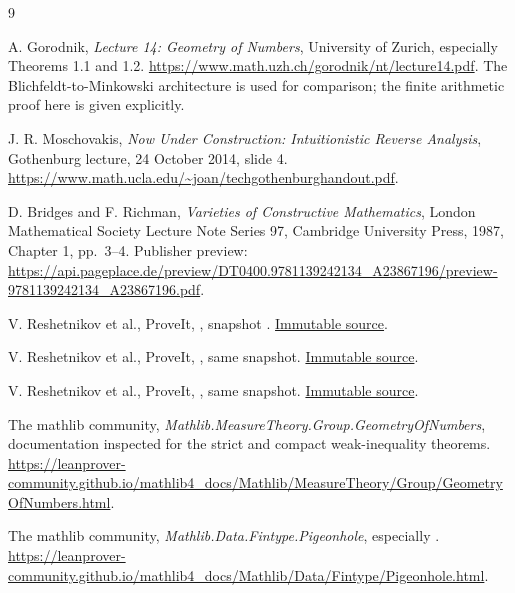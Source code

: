 \begin{thebibliography}{9}
\raggedright
{}
A. Gorodnik, \emph{Lecture 14: Geometry of Numbers},
University of Zurich, especially Theorems 1.1 and 1.2.
\url{https://www.math.uzh.ch/gorodnik/nt/lecture14.pdf}.
The Blichfeldt-to-Minkowski architecture is used
for comparison; the finite arithmetic proof
here is given explicitly.

J. R. Moschovakis, \emph{Now Under Construction:
Intuitionistic Reverse Analysis}, Gothenburg lecture,
24 October 2014, slide 4.
\url{https://www.math.ucla.edu/~joan/techgothenburghandout.pdf}.

D. Bridges and F. Richman, \emph{Varieties of
Constructive Mathematics}, London Mathematical
Society Lecture Note Series 97, Cambridge
University Press, 1987, Chapter 1, pp.\ 3--4.
Publisher preview:
\url{https://api.pageplace.de/preview/DT0400.9781139242134_A23867196/preview-9781139242134_A23867196.pdf}.

V. Reshetnikov et al., ProveIt,
,
snapshot .
\href{https://github.com/VladimirReshetnikov/ProveIt/blob/329161f8da0b319d51ba9f6246c4b19d243f7193/Logic/PrimitiveRecursiveArithmetic/ConciseIPRA/Lean/ConciseIPRA/PR.lean}{Immutable source}.

V. Reshetnikov et al., ProveIt,
,
same snapshot.
\href{https://github.com/VladimirReshetnikov/ProveIt/blob/329161f8da0b319d51ba9f6246c4b19d243f7193/Logic/PrimitiveRecursiveArithmetic/ConciseIPRA/Lean/ConciseIPRA/BiInterpretation.lean}{Immutable source}.

V. Reshetnikov et al., ProveIt,
\allowbreak
{},
same snapshot.
\href{https://github.com/VladimirReshetnikov/ProveIt/blob/329161f8da0b319d51ba9f6246c4b19d243f7193/Computability/DiophantineConsistency/IPRA_AXIOMATIZATION.md}{Immutable source}.

The mathlib community,
\emph{Mathlib.MeasureTheory.Group.GeometryOfNumbers},
documentation inspected for the strict and
compact weak-inequality theorems.
\url{https://leanprover-community.github.io/mathlib4_docs/Mathlib/MeasureTheory/Group/GeometryOfNumbers.html}.

The mathlib community,
\emph{Mathlib.Data.Fintype.Pigeonhole},
especially
.
\url{https://leanprover-community.github.io/mathlib4_docs/Mathlib/Data/Fintype/Pigeonhole.html}.
\end{thebibliography}
